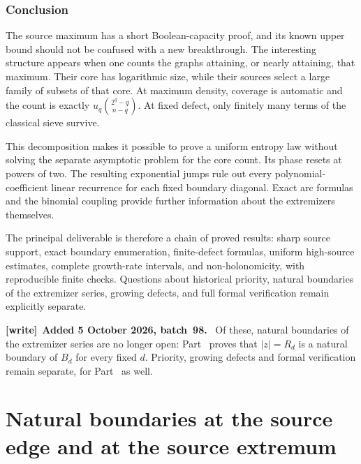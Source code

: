 \documentclass[11pt,a4paper]{article}
\theoremstyle{definition}
\newenvironment{writenote}[1][]{\par\smallskip\begingroup\small
 \noindent\textbf{[write]}\if\relax\detokenize{#1}\relax\else~\textbf{#1.}\fi\ }%
 {\par\endgroup\smallskip}
\begin{document}
\section{Conclusion}
The source maximum has a short Boolean-capacity proof, and its known
upper bound should not be confused with a new breakthrough. The
interesting structure appears when one counts the graphs attaining,
or nearly attaining, that maximum. Their core has logarithmic size,
while their sources select a large family of subsets of that core.
At maximum density, coverage is automatic and the count is exactly
$u_q\binom{2^q-q}{n-q}$. At fixed defect, only finitely many terms of the
classical sieve survive.

This decomposition makes it possible to prove a uniform entropy law
without solving the separate asymptotic problem for the core count.
Its phase resets at powers of two. The resulting exponential jumps
rule out every polynomial-coefficient linear recurrence for each fixed
boundary diagonal. Exact arc formulas and the binomial coupling provide
further information about the extremizers themselves.

The principal deliverable is therefore a chain of proved results:
sharp source support, exact boundary enumeration, finite-defect
formulas, uniform high-source estimates, complete growth-rate intervals,
and non-holonomicity, with reproducible finite checks. Questions about
historical priority, natural boundaries of the extremizer series,
growing defects, and full formal verification remain explicitly separate.

\begin{writenote}[Added 5 October 2026, batch~98]
Of these, natural boundaries of the extremizer series are no longer open:
Part~\ref{sbd:part:two} proves that $|z|=R_d$ is a natural boundary of
$B_d$ for every fixed $d$. Priority, growing defects and formal
verification remain separate, for Part~\ref{sbd:part:two} as well.
\end{writenote}


\clearpage
{}
\part{Natural boundaries at the source edge and at the source extremum}\label{sbd:part:two}
\end{document}

